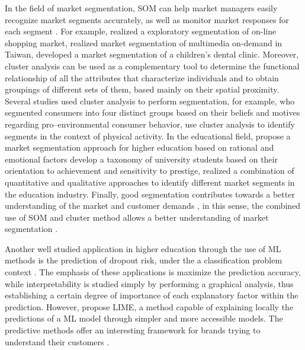 \documentclass[5p,authoryear,preprint,12pt]{elsarticle}
\begin{document}
In the field of market segmentation, SOM can help market managers easily recognize market segments accurately, as well as monitor market responses for each segment \citep{wei2012case}. For example, \citet{vellido1999segmentation} realized a exploratory segmentation of on-line shopping market, \citet{hung2008market} realized market segmentation of multimedia on-demand in Taiwan, \citet{wei2012case} developed a market segmentation of a children’s dental clinic. Moreover, cluster analysis can be used as a complementary tool to determine the functional relationship of all the attributes that characterize individuals and to obtain groupings of different sets of them, based mainly on their spatial proximity. Several studies used cluster analysis to perform segmentation, for example, \citet{park2014segmenting} who segmented consumers into four distinct groups based on their beliefs and motives regarding pro--environmental consumer behavior, \citet{rundle2015using} use cluster analysis to identify segments in the context of physical activity. In the educational field, \citet{angulo2010market} propose a market segmentation approach for higher education based on rational and emotional factors \citet{casidy2018taxonomy} develop a taxonomy of university students based on their orientation to achievement and sensitivity to prestige, \citet{davari2019data} realized a combination of quantitative and qualitative approaches to identify different market segments in the education industry. Finally, good segmentation contributes towards a better understanding of the market and customer demands \citep{zhou2019market}, in this sense, the combined use of SOM and cluster method allows a better understanding of market segmentation \citep[e.g.,][]{bao2019integration}.
 
  
Another well studied application in higher education through the use of ML methods is the prediction of dropout risk, under the a classification problem context \citep{siri2015predicting,aulck2016predicting,beaulac2019predicting}. The emphasis of these applications is maximize the prediction accuracy, while interpretability is studied simply by performing a graphical analysis, thus establishing a certain degree of importance of each explanatory factor within the prediction. However, \citet{ribeiro2016model} propose LIME, a method capable of explaining locally the predictions of a ML model through simpler and more accessible models. The predictive methods offer an interesting framework for brands trying to understand their customers \citep{doi:10.1057/jors.2014.65}. 
\end{document}

